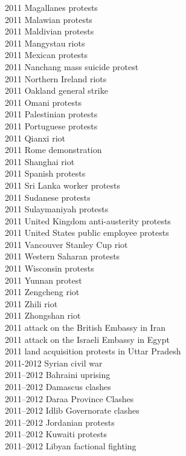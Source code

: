 2011 Magallanes protests\\
2011 Malawian protests\\
2011 Maldivian protests\\
2011 Mangystau riots\\
2011 Mexican protests\\
2011 Nanchang mass suicide protest\\
2011 Northern Ireland riots\\
2011 Oakland general strike\\
2011 Omani protests\\
2011 Palestinian protests\\
2011 Portuguese protests\\
2011 Qianxi riot\\
2011 Rome demonstration\\
2011 Shanghai riot\\
2011 Spanish protests\\
2011 Sri Lanka worker protests\\
2011 Sudanese protests\\
2011 Sulaymaniyah protests\\
2011 United Kingdom anti-austerity protests\\
2011 United States public employee protests\\
2011 Vancouver Stanley Cup riot\\
2011 Western Saharan protests\\
2011 Wisconsin protests\\
2011 Yunnan protest\\
2011 Zengcheng riot\\
2011 Zhili riot\\
2011 Zhongshan riot\\
2011 attack on the British Embassy in Iran\\
2011 attack on the Israeli Embassy in Egypt\\
2011 land acquisition protests in Uttar Pradesh\\
2011-2012 Syrian civil war\\
2011–2012 Bahraini uprising\\
2011–2012 Damascus clashes\\
2011–2012 Daraa Province Clashes\\
2011–2012 Idlib Governorate clashes\\
2011–2012 Jordanian protests\\
2011–2012 Kuwaiti protests\\
2011–2012 Libyan factional fighting\\

